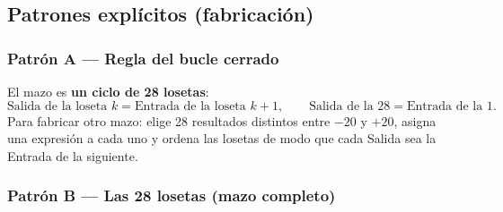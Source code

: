 \documentclass[12pt, letterpaper]{article}
\begin{document}
\subsection{Patrones explícitos (fabricación)}

\subsubsection{Patrón A — Regla del bucle cerrado}

El mazo es \textbf{un ciclo de 28 losetas}:
\[
\text{Salida de la loseta }k=\text{Entrada de la loseta }k+1,\qquad
\text{Salida de la 28}=\text{Entrada de la 1}.
\]
Para fabricar otro mazo: elige 28 resultados distintos entre $-20$ y $+20$, asigna una expresión a cada uno y ordena las losetas de modo que cada Salida sea la Entrada de la siguiente.

\subsubsection{Patrón B — Las 28 losetas (mazo completo)}
\end{document}
